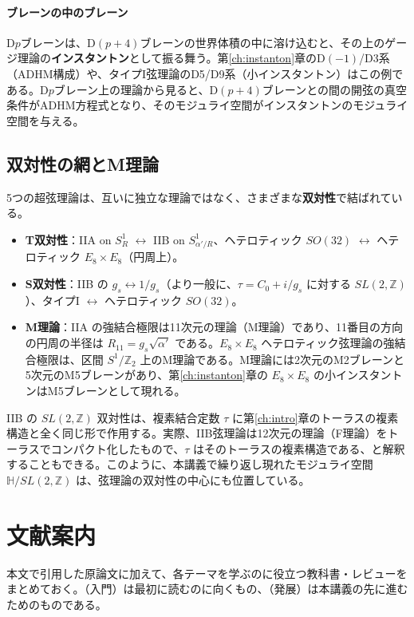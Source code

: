 \documentclass[uplatex, dvipdfmx, book]{jsbook}
\let\origsection\section
\let\origsubsection\subsection
\let\origsubsubsection\subsubsection
\newcommand{\chapter}{\origsection}
\renewcommand{\section}{\origsubsection}
\renewcommand{\subsection}{\origsubsubsection}
\renewcommand{\subsubsection}{\paragraph}
\begin{document}
\paragraph{ブレーンの中のブレーン}
D$p$ブレーンは、D$(p+4)$ブレーンの世界体積の中に溶け込むと、その上のゲージ理論の\textbf{インスタントン}として振る舞う。第\ref{ch:instanton}章のD$(-1)$/D3系（ADHM構成）や、タイプI弦理論のD5/D9系（小インスタントン）はこの例である。D$p$ブレーン上の理論から見ると、D$(p+4)$ブレーンとの間の開弦の真空条件がADHM方程式となり、そのモジュライ空間がインスタントンのモジュライ空間を与える。

\section{双対性の網とM理論}

5つの超弦理論は、互いに独立な理論ではなく、さまざまな\textbf{双対性}で結ばれている。
\begin{itemize}
    \item \textbf{T双対性}：IIA on $S^1_R$ $\leftrightarrow$ IIB on $S^1_{\alpha'/R}$、ヘテロティック $SO(32)$ $\leftrightarrow$ ヘテロティック $E_8 \times E_8$（円周上）。
    \item \textbf{S双対性}：IIB の $g_s \leftrightarrow 1/g_s$（より一般に、$\tau = C_0 + i/g_s$ に対する $SL(2, \mathbb{Z})$）、タイプI $\leftrightarrow$ ヘテロティック $SO(32)$。
    \item \textbf{M理論}：IIA の強結合極限は11次元の理論（M理論）であり、11番目の方向の円周の半径は $R_{11} = g_s\sqrt{\alpha'}$ である。$E_8 \times E_8$ ヘテロティック弦理論の強結合極限は、区間 $S^1/\mathbb{Z}_2$ 上のM理論である。M理論には2次元のM2ブレーンと5次元のM5ブレーンがあり、第\ref{ch:instanton}章の $E_8 \times E_8$ の小インスタントンはM5ブレーンとして現れる。
\end{itemize}
IIB の $SL(2, \mathbb{Z})$ 双対性は、複素結合定数 $\tau$ に第\ref{ch:intro}章のトーラスの複素構造と全く同じ形で作用する。実際、IIB弦理論は12次元の理論（F理論）をトーラスでコンパクト化したもので、$\tau$ はそのトーラスの複素構造である、と解釈することもできる。このように、本講義で繰り返し現れたモジュライ空間 $\mathbb{H}/SL(2, \mathbb{Z})$ は、弦理論の双対性の中心にも位置している。

\chapter*{文献案内}

本文で引用した原論文に加えて、各テーマを学ぶのに役立つ教科書・レビューをまとめておく。（入門）は最初に読むのに向くもの、（発展）は本講義の先に進むためのものである。
\end{document}
